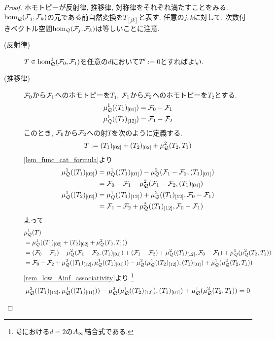 \documentclass[uplatex, a4paper, 14Q, dvipdfmx]{jsarticle}
\begin{document}
\begin{proof}
  ホモトピーが反射律, 推移律, 対称律をそれぞれ満たすことをみる.
  $\hom_{\mathcal{Q}}(\mathcal{F}_j,\mathcal{F}_k)$の元である前自然変換を$T_{[jk]}$と表す.
  任意の$j,k$に対して, 次数付きベクトル空間$\hom_{\mathcal{Q}}(\mathcal{F}_j,\mathcal{F}_k)$は等しいことに注意. 
  \begin{description}
    \item[(反射律)] $T \in \hom^0_{\mathcal{Q}}(\mathcal{F}_0,\mathcal{F}_1)$を任意の$d$において$T^d:=0$とすればよい. 
    \item[(推移律)] $\mathcal{F}_0$から$\mathcal{F}_1$へのホモトピーを$T_1$, $\mathcal{F}_1$から$\mathcal{F}_2$へのホモトピーを$T_2$とする. 
    \begin{align*}
      \mu^1_{\mathcal{Q}}((T_1)_{[01]}) = \mathcal{F}_0 -\mathcal{F}_1 \\
      \mu^1_{\mathcal{Q}}((T_2)_{[12]}) = \mathcal{F}_1 -\mathcal{F}_2 
    \end{align*}
    このとき, $\mathcal{F}_0$から$\mathcal{F}_2$への射$T$を次のように定義する. 
    \begin{align*}
      T := (T_1)_{[02]} + (T_2)_{[02]} + \mu^2_{\mathcal{Q}}(T_2,T_1)
    \end{align*}
    \cref{lem_func_cat_formula}より
    \begin{align*}
      \mu^1_{\mathcal{Q}}((T_1)_{[02]})
      &= \mu^1_Q((T_1)_{[01]}) - \mu^2_{\mathcal{Q}}(\mathcal{F}_1-\mathcal{F}_2,(T_1)_{[01]}) \\
      &= \mathcal{F}_0 - \mathcal{F}_1 - \mu^2_{\mathcal{Q}}(\mathcal{F}_1-\mathcal{F}_2,(T_1)_{[01]}) \\
      \mu^1_{\mathcal{Q}}((T_2)_{[02]})
      &= \mu^1_Q((T_1)_{[12]}) + \mu^2_{\mathcal{Q}}((T_1)_{[12]},\mathcal{F}_0-\mathcal{F}_1) \\
      &= \mathcal{F}_1 - \mathcal{F}_2 + \mu^2_{\mathcal{Q}}((T_1)_{[12]},\mathcal{F}_0-\mathcal{F}_1)
    \end{align*}
    よって
    \begin{align*}
      &\mu^1_{\mathcal{Q}}(T) \\
      &= \mu^1_{\mathcal{Q}}((T_1)_{[02]} + (T_2)_{[02]} + \mu^2_{\mathcal{Q}}(T_2,T_1)) \\
      &= (\mathcal{F}_0 - \mathcal{F}_1) - \mu^2_{\mathcal{Q}}(\mathcal{F}_1-\mathcal{F}_2,(T_1)_{[01]}) + (\mathcal{F}_1 - \mathcal{F}_2) + \mu^2_{\mathcal{Q}}((T_1)_{[12]},\mathcal{F}_0-\mathcal{F}_1) + \mu^1_{\mathcal{Q}} (\mu^2_{\mathcal{Q}}(T_2,T_1)) \\
      &= \mathcal{F}_0 -\mathcal{F}_2 + \mu^2_{\mathcal{Q}}((T_1)_{[12]},\mu^1_{\mathcal{Q}}((T_1)_{[01]})) - \mu^2_{\mathcal{Q}}(\mu^1_{\mathcal{Q}}((T_2)_{[12]}),(T_1)_{[01]}) + \mu^1_{\mathcal{Q}} (\mu^2_{\mathcal{Q}}(T_2,T_1))
    \end{align*}
    \cref{rem_low_Ainf_associativity}より
    \footnote{
      $\mathcal{Q}$における$d=2$の$A_{\infty}$結合式である. 
    }
    \begin{align*}
      \mu^2_\Q((T_1)_{[12]},\mu^1_\Q((T_1)_{[01]})) - \mu^2_\Q(\mu^1_\Q((T_2)_{[12]}),(T_1)_{[01]}) + \mu^1_\Q (\mu^2_\Q(T_2,T_1))
      = 0

\end{align*}
\end{description}
\end{proof}
\end{document}
